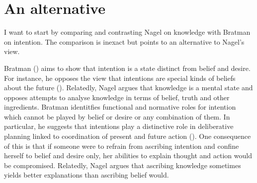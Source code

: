 \documentclass[11pt,a4paper]{extarticle}
\begin{document}
\setlength\footnotesep{1em}




\maketitle

\begin{abstract}
\noindent
***


\end{abstract}




\section{An alternative}
I want to start by
comparing and contrasting
Nagel on knowledge
with 
Bratman on intention.
The comparison is inexact but points to an alternative to Nagel's view.

Bratman
(\citeyear{bratman_faces_1999,Bratman:1987xw})
aims to show that intention is a state distinct from  belief and desire.
For instance, he opposes the view that intentions are special kinds of beliefs about the future (\citeyear[pp.\ 257ff]{bratman_faces_1999}).
Relatedly, Nagel argues that knowledge is a mental state and
opposes attempts to analyse knowledge in terms of belief, truth and other ingredients.
Bratman identitfies functional and normative roles for intention which cannot be played by belief or desire or any combination of them.
In particular, he suggests that intentions play a distinctive role in deliberative planning linked to coordination of present and future action
(\citeyear[p.\ 223]{bratman_faces_1999}).
One consequence of this is that if someone were to refrain from ascribing intention and confine herself to belief and desire only, her abilities to explain thought and action would be compromised.
Relatedly, Nagel argues that ascribing knowledge sometimes yields  better explanations than ascribing belief would.
\end{document}
